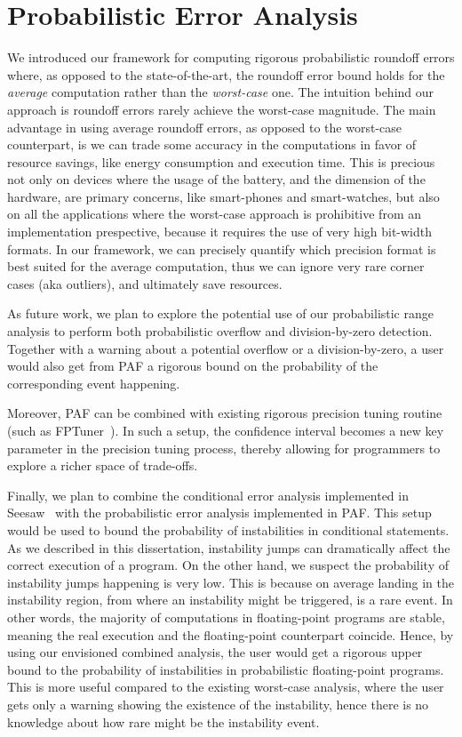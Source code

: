 \section{Probabilistic Error Analysis}
%
We introduced our framework for computing rigorous probabilistic roundoff errors where, as opposed to the state-of-the-art, the roundoff error bound holds for the \emph{average} computation rather than the \emph{worst-case} one.
%
The intuition behind our approach is roundoff errors rarely achieve the worst-case magnitude. 
%
The main advantage in using average roundoff errors, as opposed to the worst-case counterpart, is we can trade some accuracy in the computations in favor of resource savings, like energy consumption and execution time.
%
This is precious not only on devices where the usage of the battery, and the dimension of the hardware, are primary concerns, like smart-phones and smart-watches, but also on all the applications where the worst-case approach is prohibitive from an implementation prespective, because it requires the use of very high bit-width formats. 
%
In our framework, we can precisely quantify which precision format is best suited for the average computation, thus we can ignore very rare corner cases (aka outliers), and ultimately save resources.
%

As future work, we plan to explore the potential use of our probabilistic range analysis to perform both probabilistic overflow and division-by-zero detection.
%
Together with a warning about a potential overflow or a division-by-zero, a user would also get from PAF a rigorous bound on the probability of the corresponding event happening.

Moreover, PAF can be combined with existing rigorous precision tuning routine (such as FPTuner~\cite{fptuner}). 
%
In such a setup, the confidence interval becomes a new key parameter in the precision tuning process, thereby allowing for programmers to explore a richer space of trade-offs.
%

Finally, we plan to combine the conditional error analysis implemented in Seesaw~\cite{seesaw} with the probabilistic error analysis implemented in PAF. 
%
This setup would be used to bound the probability of instabilities in conditional statements.
%
As we described in this dissertation, instability jumps can dramatically affect the correct execution of a program.
%
On the other hand, we suspect the probability of instability jumps happening is very low.
%
This is because on average landing in the instability region, from where an instability might be triggered, is a rare event.
%
In other words, the majority of computations in floating-point programs are stable, meaning the real execution and the floating-point counterpart coincide.
% 
Hence, by using our envisioned combined analysis, the user would get a rigorous upper bound to the probability of instabilities in probabilistic floating-point programs.
%
This is more useful compared to the existing worst-case analysis, where the user gets only a warning showing the existence of the instability, hence there is no knowledge about how rare might be the instability event.

\newpage


